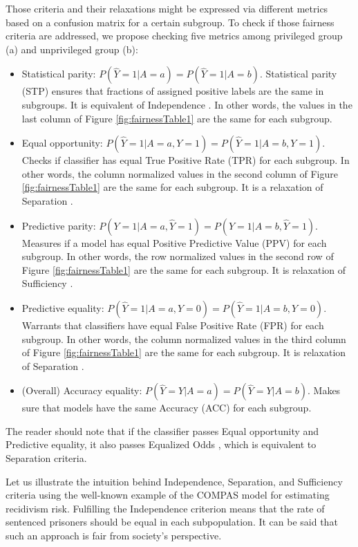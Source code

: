 Those criteria and their relaxations might be expressed via different
metrics based on a confusion matrix for a certain subgroup. To check if
those fairness criteria are addressed, we propose checking five metrics
among privileged group (a) and unprivileged group (b):

\begin{itemize}
\tightlist
\item
  Statistical parity:
  \(P(\hat{Y} = 1 | A = a) = P(\hat{Y} = 1 | A = b)\). Statistical
  parity (STP) ensures that fractions of assigned positive labels are
  the same in subgroups. It is equivalent of Independence
  \citep{statisticalparity}. In other words, the values in the last
  column of Figure \ref{fig:fairnessTable1} are the same for each
  subgroup.
\item
  Equal opportunity:
  \(P(\hat{Y} = 1 | A = a, Y = 1) = P(\hat{Y} = 1 | A = b, Y = 1)\).
  Checks if classifier has equal True Positive Rate (TPR) for each
  subgroup. In other words, the column normalized values in the second
  column of Figure \ref{fig:fairnessTable1} are the same for each
  subgroup. It is a relaxation of Separation \citep{NIPS20166374}.
\item
  Predictive parity:
  \(P(Y = 1 | A = a, \hat{Y} = 1) = P(Y = 1 | A = b, \hat{Y} = 1)\).
  Measures if a model has equal Positive Predictive Value (PPV) for each
  subgroup. In other words, the row normalized values in the second row
  of Figure \ref{fig:fairnessTable1} are the same for each subgroup. It
  is relaxation of Sufficiency \citep{ppv}.
\item
  Predictive equality:
  \(P(\hat{Y} = 1 | A = a, Y = 0) = P(\hat{Y} = 1 | A = b, Y = 0)\).
  Warrants that classifiers have equal False Positive Rate (FPR) for
  each subgroup. In other words, the column normalized values in the
  third column of Figure \ref{fig:fairnessTable1} are the same for each
  subgroup. It is relaxation of Separation \citep{ppe}.
\item
  (Overall) Accuracy equality:
  \(P(\hat{Y} = Y | A = a) = P(\hat{Y} = Y | A = b)\). Makes sure that
  models have the same Accuracy (ACC) for each subgroup.
  \citep{accuracy}
\end{itemize}

The reader should note that if the classifier passes Equal opportunity
and Predictive equality, it also passes Equalized Odds
\citep{NIPS20166374}, which is equivalent to Separation criteria.

Let us illustrate the intuition behind Independence, Separation, and
Sufficiency criteria using the well-known example of the COMPAS model
for estimating recidivism risk. Fulfilling the Independence criterion
means that the rate of sentenced prisoners should be equal in each
subpopulation. It can be said that such an approach is fair from
society's perspective.

